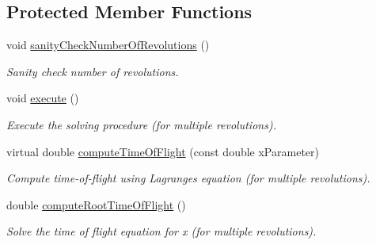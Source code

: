\subsection*{Protected Member Functions}
\begin{DoxyCompactItemize}
\item 
void \hyperlink{classtudat_1_1mission__segments_1_1MultiRevolutionLambertTargeterIzzo_a85a8176d44d76522c7294003d6c438f0}{sanity\+Check\+Number\+Of\+Revolutions} ()
\begin{DoxyCompactList}\small\item\em Sanity check number of revolutions. \end{DoxyCompactList}\item 
void \hyperlink{classtudat_1_1mission__segments_1_1MultiRevolutionLambertTargeterIzzo_a12b1d8e5895d3e73bd6c8b9a462c90ae}{execute} ()
\begin{DoxyCompactList}\small\item\em Execute the solving procedure (for multiple revolutions). \end{DoxyCompactList}\item 
virtual double \hyperlink{classtudat_1_1mission__segments_1_1MultiRevolutionLambertTargeterIzzo_a757b698ee15bb15678118698cf178a0e}{compute\+Time\+Of\+Flight} (const double x\+Parameter)
\begin{DoxyCompactList}\small\item\em Compute time-\/of-\/flight using Lagrange\textquotesingle{}s equation (for multiple revolutions). \end{DoxyCompactList}\item 
double \hyperlink{classtudat_1_1mission__segments_1_1MultiRevolutionLambertTargeterIzzo_a4dd9cff148719f99c31ace8234cef3dd}{compute\+Root\+Time\+Of\+Flight} ()
\begin{DoxyCompactList}\small\item\em Solve the time of flight equation for x (for multiple revolutions). \end{DoxyCompactList}\end{DoxyCompactItemize}
